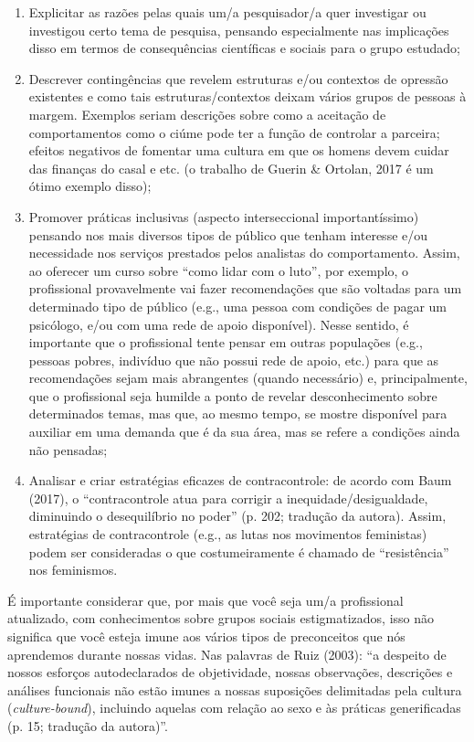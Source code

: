 \begin{enumerate}
    \item Explicitar as razões pelas quais um/a pesquisador/a quer investigar ou investigou certo tema de pesquisa, pensando especialmente nas implicações disso em termos de consequências científicas e sociais para o grupo estudado;
    \item Descrever contingências que revelem estruturas e/ou contextos de opressão existentes e como tais estruturas/contextos deixam vários grupos de pessoas à margem. Exemplos seriam descrições sobre como a aceitação de comportamentos como o ciúme pode ter a função de controlar a parceira; efeitos negativos de fomentar uma cultura em que os homens devem cuidar das finanças do casal e etc. (o trabalho de Guerin \& Ortolan, 2017 é um ótimo exemplo disso);
    \item Promover práticas inclusivas (aspecto interseccional importantíssimo) pensando nos mais diversos tipos de público que tenham interesse e/ou necessidade nos serviços prestados pelos analistas do comportamento. Assim, ao oferecer um curso sobre ``como lidar com o luto'', por exemplo, o profissional provavelmente vai fazer recomendações que são voltadas para um determinado tipo de público (e.g., uma pessoa com condições de pagar um psicólogo, e/ou com uma rede de apoio disponível). Nesse sentido, é importante que o profissional tente pensar em outras populações (e.g., pessoas pobres, indivíduo que não possui rede de apoio, etc.) para que as recomendações sejam mais abrangentes (quando necessário) e, principalmente, que o profissional seja humilde a ponto de revelar desconhecimento sobre determinados temas, mas que, ao mesmo tempo, se mostre disponível para auxiliar em uma demanda que é da sua área, mas se refere a condições ainda não pensadas;
    \item Analisar e criar estratégias eficazes de contracontrole: de acordo com Baum (2017), o ``contracontrole atua para corrigir a inequidade/desigualdade, diminuindo o desequilíbrio no poder'' (p. 202; tradução da autora). Assim, estratégias de contracontrole (e.g., as lutas nos movimentos feministas) podem ser consideradas o que costumeiramente é chamado de ``resistência'' nos feminismos.
\end{enumerate}

É importante considerar que, por mais que você seja um/a profissional atualizado, com conhecimentos sobre grupos sociais estigmatizados, isso não significa que você esteja imune aos vários tipos de preconceitos que nós aprendemos durante nossas vidas. Nas palavras de Ruiz (2003): ``a despeito de nossos esforços autodeclarados de objetividade, nossas observações, descrições e análises funcionais não estão imunes a nossas suposições delimitadas pela cultura (\textit{culture-bound}), incluindo aquelas com relação ao sexo e às práticas generificadas (p. 15; tradução da autora)''.

